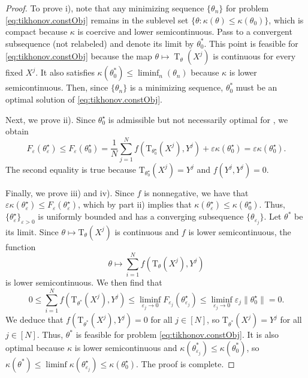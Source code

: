 \documentclass[pdflatex,sn-mathphys-num]{sn-jnl}%
\theoremstyle{thmstyleone}%
\theoremstyle{thmstyletwo}%
\theoremstyle{thmstylethree}%
\numberwithin{equation}{section}
\DeclareMathOperator{\T}{\mathrm{T}}
\begin{document}
\begin{proof}
To prove i), note that any minimizing sequence $\{\theta_n\}$ for problem \cref{eq:tikhonov.constObj} remains in the sublevel set $\{\theta: \kappa(\theta)\leq \kappa(\theta_0)\}$, which is compact because $\kappa$ is coercive and lower semicontinuous. Pass to a convergent subsequence (not relabeled) and denote its limit by $\theta_0^*$. This point is feasible for \cref{eq:tikhonov.constObj} because the map $\theta \mapsto \T_\theta(X^j)$ is continuous for every fixed $X^j$. It also satisfies $\kappa(\theta_0^*) \leq \liminf_n(\theta_n)$ because $\kappa$ is lower semicontinuous. Then, since $\{\theta_n\}$ is a minimizing sequence, $\theta_0^*$ must be an optimal solution of \cref{eq:tikhonov.constObj}.

Next, we prove ii). Since $\theta^\star_0$ is admissible but not necessarily optimal for , we obtain
\[
F_\varepsilon(\theta^\star_\varepsilon) \leq F_\varepsilon(\theta^\star_0) = \frac{1}{N}\sum_{j=1}^N f(\mathrm{T}_{\theta_0^\star}(X^j), Y^j) + \varepsilon \kappa(\theta^\star_0) = \varepsilon \kappa(\theta^\star_0).
\]
The second equality is true because $\mathrm{T}_{\theta_0^\star}(X^j) = Y^j$ and $f(Y^j, Y^j) = 0$. 

Finally, we prove iii) and iv). Since $f$ is nonnegative, we have that $
\varepsilon \kappa(\theta^\star_\varepsilon) \leq F_\varepsilon(\theta^\star_\varepsilon)$, which by part ii) implies that $\kappa(\theta^\star_\varepsilon) \leq \kappa(\theta^\star_0)$. Thus, $\{\theta^\star_\varepsilon\}_{\varepsilon > 0}$ is uniformly bounded and has a converging subsequence $\{\theta_{\varepsilon_j}\}$. Let $\theta^*$ be its limit. Since $\theta \mapsto \mathrm{T}_\theta(X^j)$ is continuous and $f$ is lower semicontinuous, the function 
\[
\theta \mapsto \sum_{i=1}^N f(\mathrm{T}_\theta(X^j), Y^j)
\]
is lower semicontinuous. We then find that
\[
0 \leq \sum_{i=1}^N f(\mathrm{T}_{\theta^*}(X^j), Y^j) \leq \liminf_{\varepsilon_j \to 0} F_{\varepsilon_j}(\theta^\star_{\varepsilon_j}) \leq \liminf_{\varepsilon_j \to 0} \varepsilon_j \|\theta^\star_0\| = 0.
\]
We deduce that $f(\mathrm{T}_{\theta^*}(X^j), Y^j) = 0$ for all $j \in [N]$, so $\mathrm{T}_{\theta^*}(X^j) = Y^j$ for all $j \in [N]$. Thus, $\theta^*$ is feasible for problem \cref{eq:tikhonov.constObj}. It is also optimal because $\kappa$ is lower semicontinuous and $\kappa(\theta^*_{\varepsilon_j}) \leq \kappa(\theta_0^*)$, so $\kappa(\theta^*) \leq \liminf \kappa(\theta^\star_{\varepsilon_j}) \leq \kappa(\theta^\star_0)$. The proof is complete.
\end{proof}
%
\end{document}
